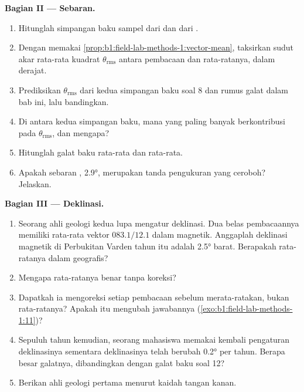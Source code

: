 \begin{problem}
\medskip
\noindent\textbf{Bagian II --- Sebaran.}
\begin{enumerate}[resume]
  \item Hitunglah simpangan baku sampel dari  dan dari .
  \item Dengan memakai \cref{prop:b1:field-lab-methods-1:vector-mean}, taksirkan sudut akar rata-rata kuadrat $\theta_{\text{rms}}$ antara pembacaan dan rata-ratanya, dalam derajat.
  \item Prediksikan $\theta_{\text{rms}}$ dari kedua simpangan baku soal 8 dan rumus galat dalam bab ini, lalu bandingkan.
  \item Di antara kedua simpangan baku, mana yang paling banyak berkontribusi pada $\theta_{\text{rms}}$, dan mengapa?
  \item Hitunglah galat baku  rata-rata dan  rata-rata.
  \item Apakah sebaran , \ang{2.9}, merupakan tanda pengukuran yang ceroboh? Jelaskan.
\end{enumerate}

\medskip
\noindent\textbf{Bagian III --- Deklinasi.}
\begin{enumerate}[resume]
  \item Seorang ahli geologi kedua lupa mengatur deklinasi. Dua belas pembacaannya memiliki rata-rata vektor $083.1/12.1$ dalam  magnetik. Anggaplah deklinasi magnetik di Perbukitan Varden tahun itu adalah \ang{2.5} barat. Berapakah rata-ratanya dalam  geografis?
  \item Mengapa  rata-ratanya benar tanpa koreksi?
  \item Dapatkah ia mengoreksi setiap pembacaan sebelum merata-ratakan, bukan rata-ratanya? Apakah itu mengubah jawabannya (\cref{exo:b1:field-lab-methods-1:11})?
  \item Sepuluh tahun kemudian, seorang mahasiswa memakai kembali pengaturan deklinasinya sementara deklinasinya telah berubah \ang{0.2} per tahun. Berapa besar galatnya, dibandingkan dengan galat baku soal 12?
  \item Berikan   ahli geologi pertama menurut kaidah tangan kanan.
\end{enumerate}


\end{problem}
